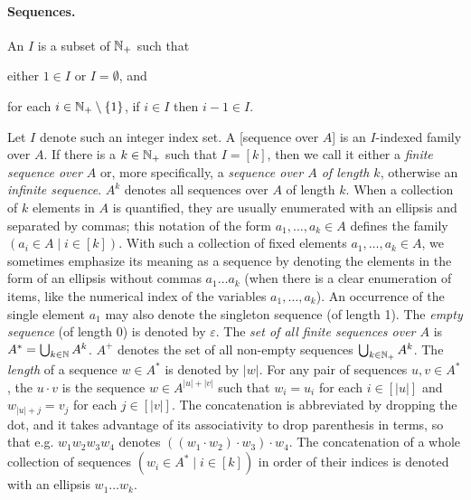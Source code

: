 \documentclass[../document.tex]{subfiles}
\begin{document}
    \paragraph{Sequences.}
    An  \(I\) is a subset of \(\mathbb{N}_+\) such that
    \begin{inparaenum}[]
        \item either \(1 \in I\) or \(I = \emptyset\), and
        \item for each \(i \in \mathbb{N}_+ \setminus \{1\}\), if \(i \in I\) then \(i-1 \in I\).
    \end{inparaenum}
    Let \(I\) denote such an integer index set.
    A [sequence over \(A\)] is an \(I\)-indexed family over \(A\).
    If there is a \(k\in \mathbb{N}_+\) such that \(I = [k]\), then we call it either a \emph{finite sequence over \(A\)} or, more specifically, a \emph{sequence over \(A\) of length \(k\)}, otherwise an \emph{infinite sequence}.
    \(A^k\) denotes all sequences over \(A\) of length \(k\).
    When a collection of \(k\) elements in \(A\) is quantified, they are usually enumerated with an ellipsis and separated by commas; this notation of the form \(a_1, \ldots, a_k \in A\) defines the family \((a_i \in A \mid i \in [k])\).
    With such a collection of fixed elements \(a_1, \ldots, a_k \in A\), we sometimes emphasize its meaning as a sequence by denoting the elements in the form of an ellipsis without commas \(a_1 \ldots a_k\) (when there is a clear enumeration of items, like the numerical index of the variables \(a_1, \ldots, a_k\)).
    An occurrence of the single element \(a_1\) may also denote the singleton sequence (of length 1).
    The \emph{empty sequence} (of length 0) is denoted by \(\varepsilon\).
    The \emph{set of all finite sequences over \(A\)} is \(A^* = \bigcup_{k \in \mathbb{N}} A^k\).
    \(A^+\) denotes the set of all non-empty sequences \(\bigcup_{k \in \mathbb{N}_+} A^k\).
    The \emph{length} of a sequence \(w \in A^*\) is denoted by \(|w|\).
    For any pair of sequences \(u,v \in A^*\), the  \(u \cdot v\) is the sequence \(w\in A^{|u|+|v|}\) such that \(w_i=u_i\) for each \(i \in [|u|]\) and \(w_{|u|+j} = v_j\) for each \(j \in [|v|]\).
    The concatenation is abbreviated by dropping the dot, and it takes advantage of its associativity to drop parenthesis in terms, so that e.g. \(w_1 w_2 w_3 w_4\) denotes \(((w_1 \cdot w_2) \cdot w_3) \cdot w_4\).
    The concatenation of a whole collection of sequences \((w_i \in A^* \mid i \in [k])\) in order of their indices is denoted with an ellipsis \(w_1 \ldots w_k\).  
\end{document}
